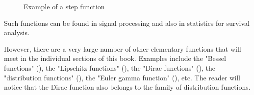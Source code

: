 \begin{enumerate}
\begin{itemize}
\begin{figure}[H]
				\vspace*{3mm}
				\caption{Example of a step function}
			\end{figure} 
			Such functions can be found in signal processing and also in statistics for survival analysis.
		\end{itemize}
	\end{enumerate}
	However, there are a very large number of other elementary functions that will meet in the individual sections of this book. Examples include the "Bessel functions" (), the "Lipschitz functions" (), the "Dirac functions" (), the "distribution functions" (), the "Euler gamma function" (), etc. The reader will notice that the Dirac function also belongs to the family of distribution functions.
	
